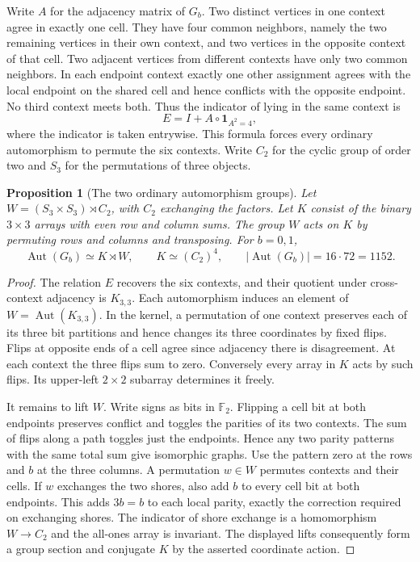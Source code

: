 \documentclass[11pt,reqno]{amsart}
\numberwithin{equation}{section}
\newtheorem{proposition}[theorem]{Proposition}
\theoremstyle{definition}
\begin{document}
Write $A$ for the adjacency matrix of $G_b$. Two distinct vertices in one context agree in exactly one cell. They have four common neighbors, namely the two remaining vertices in their own context, and two vertices in the opposite context of that cell. Two adjacent vertices from different contexts have only two common neighbors. In each endpoint context exactly one other assignment agrees with the local endpoint on the shared cell and hence conflicts with the opposite endpoint. No third context meets both. Thus the indicator of lying in the same context is
\[
                   E=I+A\circ\mathbf{1}_{A^2=4},
\]
where the indicator is taken entrywise. This formula forces every ordinary automorphism to permute the six contexts. Write $C_2$ for the cyclic group of order two and $S_3$ for the permutations of three objects.
\begin{proposition}[The two ordinary automorphism groups]\label{cor:ordinary-square}
Let $W=(S_3\times S_3)\rtimes C_2$, with $C_2$ exchanging the factors. Let $K$ consist of the binary $3\times3$ arrays with even row and column sums. The group $W$ acts on $K$ by permuting rows and columns and transposing. For $b=0,1$,
\[
 \operatorname{Aut}(G_b)\simeq K\rtimes W,\qquad
 K\simeq (C_2)^4,\qquad |\operatorname{Aut}(G_b)|=16\cdot72=1152 .
\]
\end{proposition}
\begin{proof}
The relation $E$ recovers the six contexts, and their quotient under cross-context adjacency is $K_{3,3}$. Each automorphism induces an element of $W=\operatorname{Aut}(K_{3,3})$. In the kernel, a permutation of one context preserves each of its three bit partitions and hence changes its three coordinates by fixed flips. Flips at opposite ends of a cell agree since adjacency there is disagreement. At each context the three flips sum to zero. Conversely every array in $K$ acts by such flips. Its upper-left $2\times2$ subarray determines it freely.

It remains to lift $W$. Write signs as bits in $\mathbb F_2$. Flipping a cell bit at both endpoints preserves conflict and toggles the parities of its two contexts. The sum of flips along a path toggles just the endpoints. Hence any two parity patterns with the same total sum give isomorphic graphs. Use the pattern zero at the rows and $b$ at the three columns. A permutation $w\in W$ permutes contexts and their cells. If $w$ exchanges the two shores, also add $b$ to every cell bit at both endpoints. This adds $3b=b$ to each local parity, exactly the correction required on exchanging shores. The indicator of shore exchange is a homomorphism $W\to C_2$ and the all-ones array is invariant. The displayed lifts consequently form a group section and conjugate $K$ by the asserted coordinate action.
\end{proof}
\end{document}
